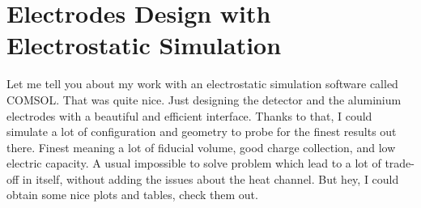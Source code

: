 
\chapter{Electrodes Design with Electrostatic Simulation} %

\label{ChapterElectrodes} %


Let me tell you about my work with an electrostatic simulation software called COMSOL.
That was quite nice. Just designing the detector and the aluminium electrodes with a beautiful and efficient interface.
Thanks to that, I could simulate a lot of configuration and geometry to probe for the finest results out there.
Finest meaning a lot of fiducial volume, good charge collection, and low electric capacity.
A usual impossible to solve problem which lead to a lot of trade-off in itself, without adding the issues about the heat channel.
But hey, I could obtain some nice plots and tables, check them out.